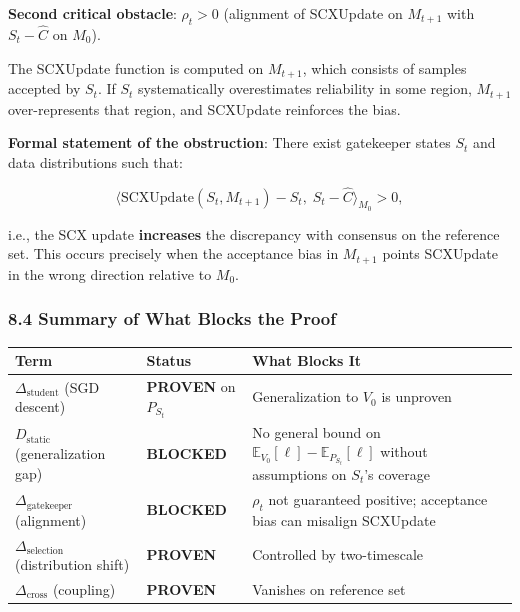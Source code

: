 \documentclass[
  12pt,
]{article}
\begin{document}
\textbf{Second critical obstacle}: \(\rho_t > 0\) (alignment of
SCXUpdate on \(M_{t+1}\) with \(S_t - \hat{C}\) on \(M_0\)).

The SCXUpdate function is computed on \(M_{t+1}\), which consists of
samples accepted by \(S_t\). If \(S_t\) systematically overestimates
reliability in some region, \(M_{t+1}\) over-represents that region, and
SCXUpdate reinforces the bias.

\textbf{Formal statement of the obstruction}: There exist gatekeeper
states \(S_t\) and data distributions such that:

\[\langle \text{SCXUpdate}(S_t, M_{t+1}) - S_t, \; S_t - \hat{C} \rangle_{M_0} > 0,\]

i.e., the SCX update \textbf{increases} the discrepancy with consensus
on the reference set. This occurs precisely when the acceptance bias in
\(M_{t+1}\) points SCXUpdate in the wrong direction relative to \(M_0\).

\subsubsection{8.4 Summary of What Blocks the
Proof}\label{summary-of-what-blocks-the-proof}

\begin{longtable}[]{@{}
  >{\raggedright\arraybackslash}p{}
  >{\raggedright\arraybackslash}p{}
  >{\raggedright\arraybackslash}p{}@{}}
\toprule\noalign{}
\begin{minipage}[b]{\linewidth}\raggedright
Term
\end{minipage} & \begin{minipage}[b]{\linewidth}\raggedright
Status
\end{minipage} & \begin{minipage}[b]{\linewidth}\raggedright
What Blocks It
\end{minipage} \\
\midrule\noalign{}
\endhead
\bottomrule\noalign{}
\endlastfoot
\(\Delta_{\text{student}}\) (SGD descent) & \textbf{PROVEN} on
\(P_{S_t}\) & Generalization to \(V_0\) is unproven \\
\(D_{\text{static}}\) (generalization gap) & \textbf{BLOCKED} & No
general bound on \(\mathbb{E}_{V_0}[\ell] - \mathbb{E}_{P_{S_t}}[\ell]\)
without assumptions on \(S_t\)'s coverage \\
\(\Delta_{\text{gatekeeper}}\) (alignment) & \textbf{BLOCKED} &
\(\rho_t\) not guaranteed positive; acceptance bias can misalign
SCXUpdate \\
\(\Delta_{\text{selection}}\) (distribution shift) & \textbf{PROVEN} &
Controlled by two-timescale \\
\(\Delta_{\text{cross}}\) (coupling) & \textbf{PROVEN} & Vanishes on
reference set \\
\end{longtable}
\end{document}
